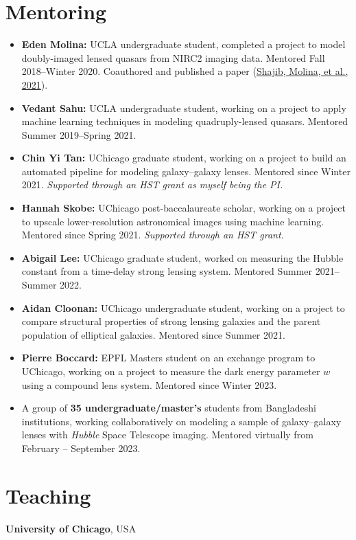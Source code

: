 \documentclass[margin, line]{res}
\begin{document}
\begin{resume}
\section{\sc Mentoring}
\begin{itemize}
	\item \textbf{Eden Molina:} UCLA undergraduate student, completed a project to model doubly-imaged lensed quasars from NIRC2 imaging data. Mentored Fall 2018--Winter 2020. Coauthored and published a paper (\href{https://doi:10.1093/mnras/stab532}{Shajib, Molina, et al., 2021}).
	\item \textbf{Vedant Sahu:} UCLA undergraduate student, working on a project to apply machine learning techniques in modeling quadruply-lensed quasars. Mentored Summer 2019--Spring 2021.
	\item \textbf{Chin Yi Tan:} UChicago graduate student, working on a project to build an automated pipeline for modeling galaxy--galaxy lenses. Mentored since Winter 2021. \textit{Supported through an \textsc{HST} grant as myself being the PI.}
	\item \textbf{Hannah Skobe:} UChicago post-baccalaureate scholar, working on a project to upscale lower-resolution astronomical images using machine learning. Mentored since Spring 2021. \textit{Supported through an HST grant.}
	\item \textbf{Abigail Lee:} UChicago graduate student, worked on measuring the Hubble constant from a time-delay strong lensing system. Mentored Summer 2021--Summer 2022.
	\item \textbf{Aidan Cloonan:} UChicago undergraduate student, working on a project to compare structural properties of strong lensing galaxies and the parent population of elliptical galaxies. Mentored since Summer 2021.
	\item \textbf{Pierre Boccard:} EPFL Masters student on an exchange program to UChicago, working on a project to measure the dark energy parameter $w$ using a compound lens system. Mentored since Winter 2023.
	\item A group of \textbf{35 undergraduate/master's} students from Bangladeshi institutions, working collaboratively on modeling a sample of galaxy--galaxy lenses with \textit{Hubble} Space Telescope imaging. Mentored virtually from February -- September 2023.
\end{itemize}


\section{\sc Teaching}
{\bf University of Chicago}, USA


\end{resume}
\end{document}
